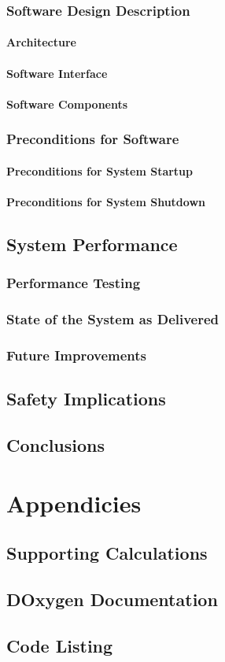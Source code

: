 \documentclass[10pt,a4paper]{report}
\begin{document}
\section{Software Design Description}
\subsection{Architecture}
\subsection{Software Interface}
\subsection{Software Components}

\section{Preconditions for Software}
\subsection{Preconditions for System Startup}
\subsection{Preconditions for System Shutdown}

\chapter{System Performance}
\section{Performance Testing}
\section{State of the System as Delivered}
\section{Future Improvements}

\chapter{Safety Implications}

\chapter{Conclusions}

\part{Appendicies}

\chapter{Supporting Calculations}

\chapter{DOxygen Documentation}

\chapter{Code Listing}
\end{document}
